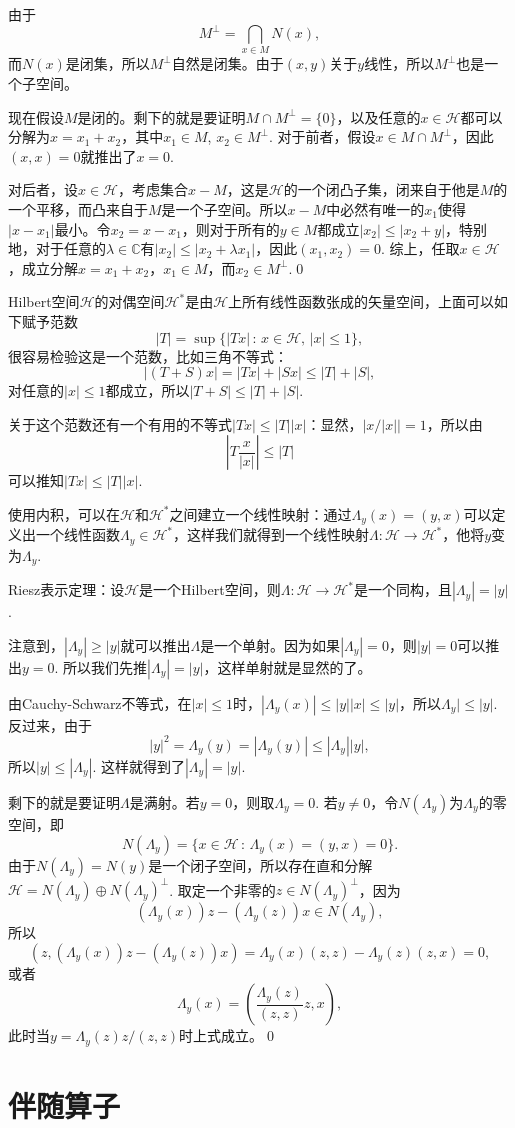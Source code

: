 \documentclass[9pt]{extbook}
\newcommand{\cc}{\mathbb{C}}
\begin{document}
\proof 由于
\[
	M^\bot=\bigcap_{x\in M}N(x),
\]
而$N(x)$是闭集，所以$M^\bot$自然是闭集。由于$(x,y)$关于$y$线性，所以$M^\bot$也是一个子空间。

现在假设$M$是闭的。剩下的就是要证明$M\cap M^\bot=\{0\}$，以及任意的$x\in \mathcal{H}$都可以分解为$x=x_1+x_2$，其中$x_1\in M$, $x_2\in M^\bot$. 对于前者，假设$x\in M\cap M^\bot$，因此$(x,x)=0$就推出了$x=0$. 

对后者，设$x\in \mathcal{H}$，考虑集合$x-M$，这是$\mathcal{H}$的一个闭凸子集，闭来自于他是$M$的一个平移，而凸来自于$M$是一个子空间。所以$x-M$中必然有唯一的$x_1$使得$|x-x_1|$最小。令$x_2=x-x_1$，则对于所有的$y\in M$都成立$|x_2|\leq |x_2+y|$，特别地，对于任意的$\lambda\in \cc$有$|x_2|\leq |x_2+\lambda x_1|$，因此$(x_1,x_2)=0$. 综上，任取$x\in \mathcal{H}$，成立分解$x=x_1+x_2$，$x_1\in M$，而$x_2\in M^\bot$.\qed

\para Hilbert空间$\mathcal{H}$的对偶空间$\mathcal{H}^*$是由$\mathcal{H}$上所有线性函数张成的矢量空间，上面可以如下赋予范数
\[
	|T|=\sup\bigl\{|Tx|\,:\,x\in \mathcal{H},\,|x|\leq 1\bigr\},
\]
很容易检验这是一个范数，比如三角不等式：
\[
	|(T+S)x|=|Tx|+|Sx|\leq |T|+|S|,
\]
对任意的$|x|\leq 1$都成立，所以$|T+S|\leq |T|+|S|$.

关于这个范数还有一个有用的不等式$|Tx|\leq |T||x|$：显然，$|x/|x||=1$，所以由
\[
	\left|T\frac{x}{|x|}\right|\leq |T|
\]
可以推知$|Tx|\leq |T||x|$. 

\para 使用内积，可以在$\mathcal{H}$和$\mathcal{H}^*$之间建立一个线性映射：通过$\Lambda_y(x)=(y,x)$可以定义出一个线性函数$\Lambda_y\in \mathcal{H}^*$，这样我们就得到一个线性映射$\Lambda:\mathcal{H}\to \mathcal{H}^*$，他将$y$变为$\Lambda_{y}$.

\theo Riesz表示定理：设$\mathcal{H}$是一个Hilbert空间，则$\Lambda:\mathcal{H}\to \mathcal{H}^*$是一个同构，且$|\Lambda_y|=|y|$.

\proof
	注意到，$|\Lambda_y|\geq |y|$就可以推出$\Lambda$是一个单射。因为如果$|\Lambda_y|=0$，则$|y|=0$可以推出$y=0$. 所以我们先推$|\Lambda_y|=|y|$，这样单射就是显然的了。

	由Cauchy-Schwarz不等式，在$|x|\leq 1$时，$|\Lambda_y(x)|\leq |y||x|\leq |y|$，所以$\Lambda_y|\leq |y|$. 反过来，由于
	\[
		|y|^2=\Lambda_y(y)=|\Lambda_y(y)|\leq |\Lambda_y||y|,
	\]
	所以$|y|\leq |\Lambda_y|$. 这样就得到了$|\Lambda_y|=|y|$. 

	剩下的就是要证明$\Lambda$是满射。若$y=0$，则取$\Lambda_y=0$. 若$y\neq 0$，令$N(\Lambda_y)$为$\Lambda_y$的零空间，即
	\[
		N(\Lambda_y)=\bigl\{x\in\mathcal{H}\,:\, \Lambda_y(x)=(y,x)=0\bigr\}.
	\]
	由于$N(\Lambda_y)=N(y)$是一个闭子空间，所以存在直和分解$\mathcal{H}=N(\Lambda_y)\oplus N(\Lambda_y)^\bot$. 取定一个非零的$z\in N(\Lambda_y)^\bot$，因为
	\[
		(\Lambda_y(x))z-(\Lambda_y(z))x\in N(\Lambda_y),
	\]
	所以
	\[
		(z,(\Lambda_y(x))z-(\Lambda_y(z))x)=\Lambda_y(x)(z,z)-\Lambda_y(z)(z,x)=0,
	\]
	或者
	\[
		\Lambda_y(x)=\left(\frac{\Lambda_y(z)}{(z,z)}z,x\right),
	\]
	此时当$y=\Lambda_y(z)z/(z,z)$时上式成立。\qed

\section{伴随算子}
\end{document}
